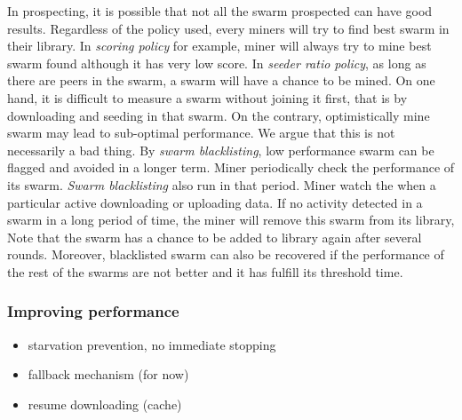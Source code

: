 In prospecting, it is possible that not all the swarm prospected can have good results. Regardless of the policy used, every miners will try to find best swarm in their library. In \textit{scoring policy} for example, miner will always try to mine best swarm found although it has very low score. In \textit{seeder ratio policy}, as long as there are peers in the swarm, a swarm will have a chance to be mined. On one hand, it is difficult to measure a swarm without joining it first, that is by downloading and seeding in that swarm. On the contrary, optimistically mine swarm may lead to sub-optimal performance. We argue that this is not necessarily a bad thing. By \textit{swarm blacklisting}, low performance swarm can be flagged and avoided in a longer term. Miner periodically check the performance of its swarm. \textit{Swarm blacklisting} also run in that period. Miner watch the when a particular active downloading or uploading data. If no activity detected in a swarm in a long period of time, the miner will remove this swarm from its library, Note that the swarm has a chance to be added to library again after several rounds. Moreover, blacklisted swarm can also be recovered if the performance of the rest of the swarms are not better and it has fulfill its threshold time. 

\subsubsection{Improving performance}


\begin{itemize}
	\item starvation prevention, no immediate stopping
	\item fallback mechanism (for now)
	\item 	 resume downloading (cache)
\end{itemize}

